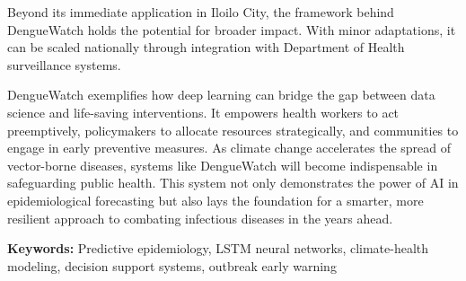 Beyond its immediate application in Iloilo City, the framework behind DengueWatch holds the potential for broader impact. With minor adaptations, it can be scaled nationally through integration with Department of Health surveillance systems.

DengueWatch exemplifies how deep learning can bridge the gap between data science and life-saving interventions. It empowers health workers to act preemptively, policymakers to allocate resources strategically, and communities to engage in early preventive measures. As climate change accelerates the spread of vector-borne diseases, systems like DengueWatch will become indispensable in safeguarding public health. This system not only demonstrates the power of AI in epidemiological forecasting but also lays the foundation for a smarter, more resilient approach to combating infectious diseases in the years ahead.

\textbf{Keywords:} Predictive epidemiology, LSTM neural networks, climate-health modeling, decision support systems, outbreak early warning
